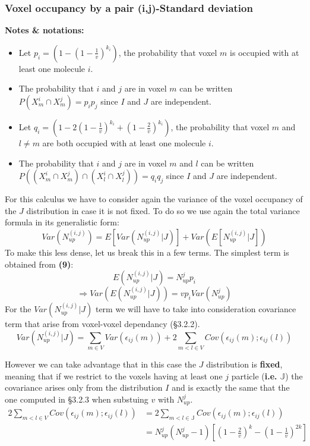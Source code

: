 \documentclass{article}
\begin{document}
\subsubsection{Voxel occupancy by a pair (i,j)-Standard deviation}

\textbf{Notes \& notations:}
\begin{itemize}
    \item Let $p_i = (1-{(1-\frac{1}{v})}^{k_i})$, the probability that voxel $m$ is occupied with at least one molecule $i$.
    \item The probability that $i$ and $j$ are in voxel $m$ can be written $P(X^i_m \cap X^j_m) = p_ip_j$ since $I$ and $J$ are independent.
    \item Let $q_i = (1-2{(1-\frac{1}{v})}^{k_i} + {(1-\frac{2}{v})}^{k_i})$, the probability that voxel $m$ and $l\neq m$ are both occupied with at least
    one molecule $i$.
    \item The probability that $i$ and $j$ are in voxel $m$ and $l$ can be written $P((X^i_m \cap X^j_m) \cap (X^i_l \cap X^j_l)) = q_iq_j$ since $I$ and $J$ are independent.
\end{itemize}

For this calculus we have to consider again the variance of the voxel occupancy of the $J$ distribution in case it is not fixed. To do so we use again
the total variance formula in its generalistic form:
\[
    Var(N^{(i,j)}_{up}) = E[Var(N^{(i,j)}_{up}|J)] + Var(E[N^{(i,j)}_{up}|J])
\]
To make this less dense, let us break this in a few terms.\newline
The simplest term is obtained from \textbf{(9)}:
\[
E(N^{(i,j)}_{up}|J) = N^j_{up}p_i
\]
\[
    \Rightarrow Var(E(N^{(i,j)}_{up}|J)) = vp_iVar(N^j_{up})
\]
For the $Var(N^{(i,j)}_{up}|J)$ term we will have to take into consideration covariance term that arise from voxel-voxel dependancy (\S3.2.2). 
\[
    Var(N^{(i,j)}_{up}|J) = \sum_{m\in V}Var(\epsilon_{ij}(m)) + 2\sum_{m < l \in V}Cov(\epsilon_{ij}(m); \epsilon_{ij}(l))
\]

However we can take advantage that in this case the $J$ distribution is \textbf{fixed}, meaning that if we restrict
to the voxels having at least one $j$ particle (\textbf{i.e.} $\mathbb{J}$) the covariance arises only from the distribution $I$ and is exactly the same
that the one computed in \S3.2.3 when substuing $v$ with $N^j_{up}$.
\[\begin{split}
    2\sum_{m < l \in V}Cov(\epsilon_{ij}(m); \epsilon_{ij}(l)) &= 2\sum_{m < l \in \mathbb{J}}Cov(\epsilon_{ij}(m); \epsilon_{ij}(l)) \\
                & = N^j_{up}(N^j_{up}-1)[(1-\frac{2}{v})^k - (1-\frac{1}{v})^{2k}]
\end{split}
\]
\end{document}
